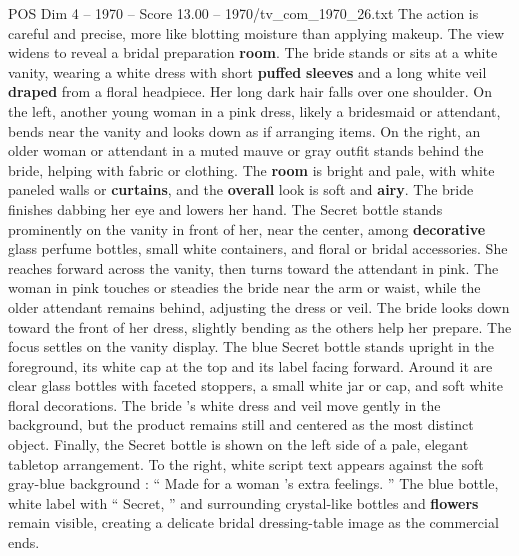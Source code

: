 \begin{textsample}{POS Dim 4 – 1970 – Score 13.00 – 1970/tv\_com\_1970\_26.txt}
The action is careful and precise, more like blotting moisture than applying makeup.
The view widens to reveal a bridal preparation \textbf{room}.
The bride stands or sits at a white vanity, wearing a white dress with short \textbf{puffed} \textbf{sleeves} and a long white veil \textbf{draped} from a floral headpiece.
Her long dark hair falls over one shoulder.
On the left, another young woman in a pink dress, likely a bridesmaid or attendant, bends near the vanity and looks down as if arranging items.
On the right, an older woman or attendant in a muted mauve or gray outfit stands behind the bride, helping with fabric or clothing.
The \textbf{room} is bright and pale, with white paneled walls or \textbf{curtains}, and the \textbf{overall} look is soft and \textbf{airy}.
The bride finishes dabbing her eye and lowers her hand.
The Secret bottle stands prominently on the vanity in front of her, near the center, among \textbf{decorative} glass perfume bottles, small white containers, and floral or bridal accessories.
She reaches forward across the vanity, then turns toward the attendant in pink.
The woman in pink touches or steadies the bride near the arm or waist, while the older attendant remains behind, adjusting the dress or veil.
The bride looks down toward the front of her dress, slightly bending as the others help her prepare.
The focus settles on the vanity display.
The blue Secret bottle stands upright in the foreground, its white cap at the top and its label facing forward.
Around it are clear glass bottles with faceted stoppers, a small white jar or cap, and soft white floral decorations.
The bride ’s white dress and veil move gently in the background, but the product remains still and centered as the most distinct object.
Finally, the Secret bottle is shown on the left side of a pale, elegant tabletop arrangement.
To the right, white script text appears against the soft gray-blue background : “ Made for a woman ’s extra feelings. ” The blue bottle, white label with “ Secret, ” and surrounding crystal-like bottles and \textbf{flowers} remain visible, creating a delicate bridal dressing-table image as the commercial ends.

\end{textsample}
